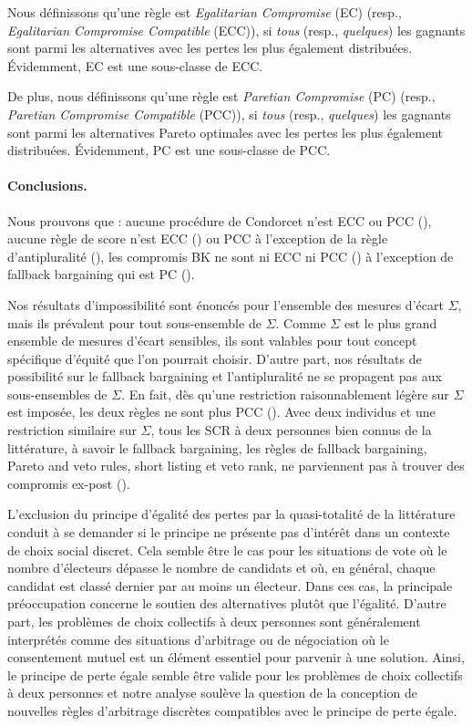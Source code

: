 	Nous définissons qu'une règle est \textit{Egalitarian Compromise} (EC) (resp., \textit{Egalitarian Compromise Compatible} (ECC)), si \emph{tous} (resp., \emph{quelques}) les gagnants sont parmi les alternatives avec les pertes les plus également distribuées. Évidemment, EC est une sous-classe de ECC.
	
	De plus, nous définissons qu'une règle est \textit{Paretian Compromise} (PC) (resp., \textit{Paretian Compromise Compatible} (PCC)), si \emph{tous} (resp., \emph{quelques}) les gagnants sont parmi les alternatives Pareto optimales avec les pertes les plus également distribuées. Évidemment, PC est une sous-classe de PCC.

	\paragraph{Conclusions.}
	Nous prouvons que : aucune procédure de Condorcet n'est ECC ou PCC (), aucune règle de score n'est ECC () ou PCC à l'exception de la règle d'antipluralité (), les compromis \acs{BK} ne sont ni ECC ni PCC () à l'exception de fallback bargaining qui est PC ().
	
	Nos résultats d'impossibilité sont énoncés pour l'ensemble des mesures d'écart $\Sigma$, mais ils prévalent pour tout sous-ensemble de $\Sigma$. Comme $\Sigma$ est le plus grand ensemble de mesures d'écart sensibles, ils sont valables pour tout concept spécifique d'équité que l'on pourrait choisir. D'autre part, nos résultats de possibilité sur le fallback bargaining et l'antipluralité ne se propagent pas aux sous-ensembles de $\Sigma$. En fait, dès qu'une restriction raisonnablement légère sur $\Sigma$ est imposée, les deux règles ne sont plus PCC (). Avec deux individus et une restriction similaire sur $\Sigma$, tous les SCR à deux personnes bien connus de la littérature, à savoir le fallback bargaining, les règles de fallback bargaining, Pareto and veto rules, short listing et veto rank, ne parviennent pas à trouver des compromis ex-post ().
	
	L'exclusion du principe d'égalité des pertes par la quasi-totalité de la littérature conduit à se demander si le principe ne présente pas d'intérêt dans un contexte de choix social discret. Cela semble être le cas pour les situations de vote où le nombre d'électeurs dépasse le nombre de candidats et où, en général, chaque candidat est classé dernier par au moins un électeur. Dans ces cas, la principale préoccupation concerne le soutien des alternatives plutôt que l'égalité. D'autre part, les problèmes de choix collectifs à deux personnes sont généralement interprétés comme des situations d'arbitrage ou de négociation où le consentement mutuel est un élément essentiel pour parvenir à une solution. Ainsi, le principe de perte égale semble être valide pour les problèmes de choix collectifs à deux personnes et notre analyse soulève la question de la conception de nouvelles règles d'arbitrage discrètes compatibles avec le principe de perte égale.


